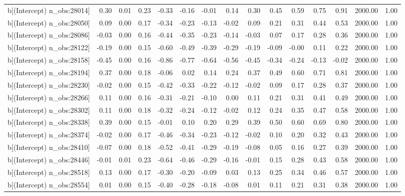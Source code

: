 \begin{table}[ht]
\begin{tabular}{rrrrrrrrrrrrrrr}
  b[(Intercept) n\_obs:28014] & 0.30 & 0.01 & 0.23 & -0.33 & -0.16 & -0.01 & 0.14 & 0.30 & 0.45 & 0.59 & 0.75 & 0.91 & 2000.00 & 1.00 \\ 
  b[(Intercept) n\_obs:28050] & 0.09 & 0.00 & 0.17 & -0.34 & -0.23 & -0.13 & -0.02 & 0.09 & 0.21 & 0.31 & 0.44 & 0.53 & 2000.00 & 1.00 \\ 
  b[(Intercept) n\_obs:28086] & -0.03 & 0.00 & 0.16 & -0.44 & -0.35 & -0.23 & -0.14 & -0.03 & 0.07 & 0.17 & 0.28 & 0.36 & 2000.00 & 1.00 \\ 
  b[(Intercept) n\_obs:28122] & -0.19 & 0.00 & 0.15 & -0.60 & -0.49 & -0.39 & -0.29 & -0.19 & -0.09 & -0.00 & 0.11 & 0.22 & 2000.00 & 1.00 \\ 
  b[(Intercept) n\_obs:28158] & -0.45 & 0.00 & 0.16 & -0.86 & -0.77 & -0.64 & -0.56 & -0.45 & -0.34 & -0.24 & -0.13 & -0.02 & 2000.00 & 1.00 \\ 
  b[(Intercept) n\_obs:28194] & 0.37 & 0.00 & 0.18 & -0.06 & 0.02 & 0.14 & 0.24 & 0.37 & 0.49 & 0.60 & 0.71 & 0.81 & 2000.00 & 1.00 \\ 
  b[(Intercept) n\_obs:28230] & -0.02 & 0.00 & 0.15 & -0.42 & -0.33 & -0.22 & -0.12 & -0.02 & 0.09 & 0.17 & 0.28 & 0.37 & 2000.00 & 1.00 \\ 
  b[(Intercept) n\_obs:28266] & 0.11 & 0.00 & 0.16 & -0.31 & -0.21 & -0.10 & 0.00 & 0.11 & 0.21 & 0.31 & 0.41 & 0.49 & 2000.00 & 1.00 \\ 
  b[(Intercept) n\_obs:28302] & 0.11 & 0.00 & 0.18 & -0.32 & -0.24 & -0.12 & -0.02 & 0.12 & 0.24 & 0.35 & 0.47 & 0.58 & 2000.00 & 1.00 \\ 
  b[(Intercept) n\_obs:28338] & 0.39 & 0.00 & 0.15 & -0.01 & 0.10 & 0.20 & 0.29 & 0.39 & 0.50 & 0.60 & 0.69 & 0.80 & 2000.00 & 1.00 \\ 
  b[(Intercept) n\_obs:28374] & -0.02 & 0.00 & 0.17 & -0.46 & -0.34 & -0.23 & -0.12 & -0.02 & 0.10 & 0.20 & 0.32 & 0.43 & 2000.00 & 1.00 \\ 
  b[(Intercept) n\_obs:28410] & -0.07 & 0.00 & 0.18 & -0.52 & -0.41 & -0.29 & -0.19 & -0.08 & 0.05 & 0.16 & 0.27 & 0.39 & 2000.00 & 1.00 \\ 
  b[(Intercept) n\_obs:28446] & -0.01 & 0.01 & 0.23 & -0.64 & -0.46 & -0.29 & -0.16 & -0.01 & 0.15 & 0.28 & 0.43 & 0.58 & 2000.00 & 1.00 \\ 
  b[(Intercept) n\_obs:28518] & 0.13 & 0.00 & 0.17 & -0.30 & -0.20 & -0.09 & 0.03 & 0.13 & 0.25 & 0.34 & 0.46 & 0.57 & 2000.00 & 1.00 \\ 
  b[(Intercept) n\_obs:28554] & 0.01 & 0.00 & 0.15 & -0.40 & -0.28 & -0.18 & -0.08 & 0.01 & 0.11 & 0.21 & 0.31 & 0.38 & 2000.00 & 1.00 \\ 

\end{tabular}
\end{table}
